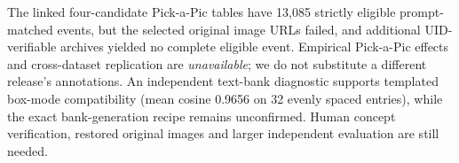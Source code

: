 The linked four-candidate Pick-a-Pic tables have 13,085 strictly eligible prompt-matched events, but the selected original image URLs failed, and additional UID-verifiable archives yielded no complete eligible event. Empirical Pick-a-Pic effects and cross-dataset replication are \emph{unavailable}; we do not substitute a different release's annotations. An independent text-bank diagnostic supports templated box-mode compatibility (mean cosine 0.9656 on 32 evenly spaced entries), while the exact bank-generation recipe remains unconfirmed. Human concept verification, restored original images and larger independent evaluation are still needed.
